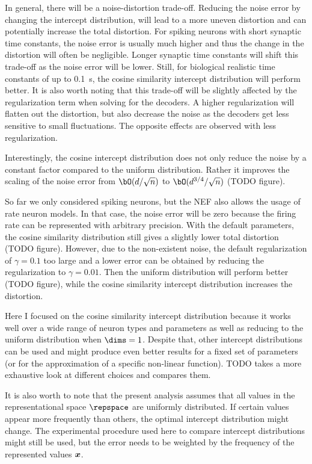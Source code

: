 In general, there will be a noise-distortion trade-off.
Reducing the noise error by changing the intercept distribution, will lead to a more uneven distortion and can potentially increase the total distortion.
For spiking neurons with short synaptic time constants, the noise error is usually much higher and thus the change in the distortion will often be negligible.
Longer synaptic time constants will shift this trade-off as the noise error will be lower.
Still, for biological realistic time constants of up to \SI{0.1}{\second}, the cosine similarity intercept distribution will perform better.
It is also worth noting that this trade-off will be slightly affected by the regularization term when solving for the decoders.
A higher regularization will flatten out the distortion, but also decrease the noise as the decoders get less sensitive to small fluctuations.
The opposite effects are observed with less regularization.

Interestingly, the cosine intercept distribution does not only reduce the noise by a constant factor compared to the uniform distribution.
Rather it improves the scaling of the noise error from $\bO(d/\sqrt{n})$ to $\bO(d^{3/4}/\sqrt{n})$ (TODO figure).

So far we only considered spiking neurons, but the NEF also allows the usage of rate neuron models.
In that case, the noise error will be zero because the firing rate can be represented with arbitrary precision.
With the default parameters, the cosine similarity distribution still gives a slightly lower total distortion (TODO figure).
However, due to the non-existent noise, the default regularization of $\gamma = 0.1$ too large and a lower error can be obtained by reducing the regularization to $\gamma = 0.01$.
Then the uniform distribution will perform better (TODO figure), while the cosine similarity intercept distribution increases the distortion.

Here I focused on the cosine similarity intercept distribution because it works well over a wide range of neuron types and parameters as well as reducing to the uniform distribution when $\dims = 1$.
Despite that, other intercept distributions can be used and might produce even better results for a fixed set of parameters (or for the approximation of a specific non-linear function).
TODO takes a more exhaustive look at different choices and compares them.

It is also worth to note that the present analysis assumes that all values in the representational space $\repspace$ are uniformly distributed.
If certain values appear more frequently than others, the optimal intercept distribution might change.
The experimental procedure used here to compare intercept distributions might still be used, but the error needs to be weighted by the frequency of the represented values $\bm{x}$.



